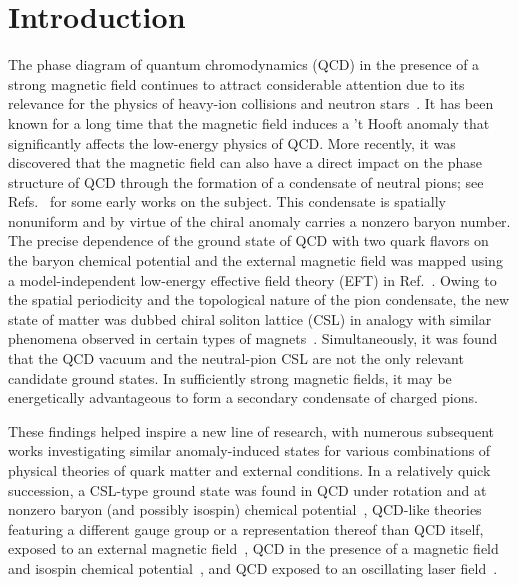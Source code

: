 \documentclass[pdflatex,iicol,sn-mathphys-num]{sn-jnl}
\begin{document}

\section{Introduction}
\label{sec:intro}

The phase diagram of quantum chromodynamics (QCD) in the presence of a strong magnetic field continues to attract considerable attention due to its relevance for the physics of heavy-ion collisions and neutron stars~\cite{Andersen:2014xxa,Miransky:2015ava}. It has been known for a long time that the magnetic field induces a 't Hooft anomaly that significantly affects the low-energy physics of QCD. More recently, it was discovered that the magnetic field can also have a direct impact on the phase structure of QCD through the formation of a condensate of neutral pions; see Refs.~\cite{Son2004a,Son:2007ny,Bergman:2008qv,Thompson:2008qw,Rebhan:2008ur,Eto2013a} for some early works on the subject. This condensate is spatially nonuniform and by virtue of the chiral anomaly carries a nonzero baryon number. The precise dependence of the ground state of QCD with two quark flavors on the baryon chemical potential and the external magnetic field was mapped using a model-independent low-energy effective field theory (EFT) in Ref.~\cite{Brauner:2016pko}. Owing to the spatial periodicity and the topological nature of the pion condensate, the new state of matter was dubbed chiral soliton lattice (CSL) in analogy with similar phenomena observed in certain types of magnets~\cite{Togawa2012a,Kishine2015a}. Simultaneously, it was found that the QCD vacuum and the neutral-pion CSL are not the only relevant candidate ground states. In sufficiently strong magnetic fields, it may be energetically advantageous to form a secondary condensate of charged pions.

These findings helped inspire a new line of research, with numerous subsequent works investigating similar anomaly-induced states for various combinations of physical theories of quark matter and external conditions. In a relatively quick succession, a CSL-type ground state was found in QCD under rotation and at nonzero baryon (and possibly isospin) chemical potential~\cite{Huang:2017pqe,Nishimura:2020odq,Eto:2021gyy,Eto:2023rzd}, QCD-like theories featuring a different gauge group or a representation thereof than QCD itself, exposed to an external magnetic field~\cite{Brauner:2019rjg,Brauner:2019aid}, QCD in the presence of a magnetic field and isospin chemical potential~\cite{Gronli:2022cri}, and QCD exposed to an oscillating laser field~\cite{Yamada:2021jhy}.
\end{document}
